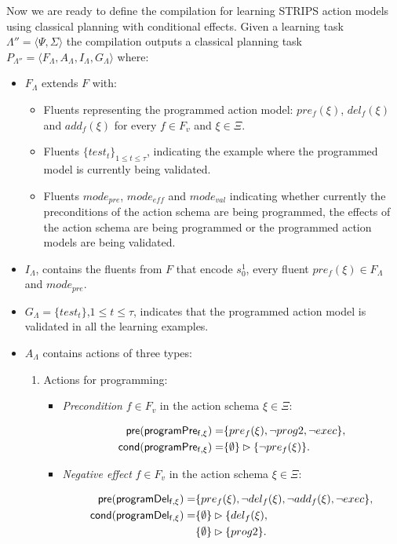 \documentclass[letterpaper]{article} %
\newcommand{\tup}[1]{{\langle #1 \rangle}}
\newcommand{\pre}{\mathsf{pre}}     %
\newcommand{\cond}{\mathsf{cond}}   %
\begin{document}
Now we are ready to define the compilation for learning STRIPS action models using classical planning with conditional effects. Given a learning task $\Lambda''=\tup{\Psi,\Sigma}$ the compilation outputs a classical planning task $P_{\Lambda''}=\tup{F_{\Lambda},A_{\Lambda},I_{\Lambda},G_{\Lambda}}$ where:
\begin{itemize}
\item $F_{\Lambda}$ extends $F$ with:
\begin{itemize}
\item Fluents representing the programmed action model: $pre_f(\xi)$, $del_f(\xi)$ and $add_f(\xi)$ for every $f\in F_v$ and $\xi \in \Xi$.
\item Fluents $\{test_t\}_{1\leq t\leq \tau}$, indicating the example where the programmed model is currently being validated.
\item Fluents $mode_{pre}$, $mode_{eff}$ and $mode_{val}$ indicating whether currently the preconditions of the action schema are being programmed, the effects of the action schema are being programmed or the programmed action models are being validated.
\end{itemize}
\item $I_{\Lambda}$, contains the fluents from $F$ that encode $s_0^1$, every fluent $pre_f(\xi)\in F_{\Lambda}$ and $mode_{pre}$. 
\item $G_{\Lambda}=\{test_t\}$,{\small $1\leq t\leq \tau$}, indicates that the programmed action model is validated in all the learning examples.
\item $A_{\Lambda}$ contains actions of three types:
\begin{enumerate}
\item Actions for programming:

\begin{itemize}
\item {\em Precondition} $f\in F_v$ in the action schema $\xi\in\Xi$:
\begin{small}
\begin{align*}
\hspace*{7pt}\pre(\mathsf{programPre_{f,\xi}})=&\{pre_{f}(\xi),\neg prog2,\neg exec\},\\    
\cond(\mathsf{programPre_{f,\xi}})=&\{\emptyset\}\rhd\{\neg pre_{f}(\xi)\}.
\end{align*}
\end{small}

\item {\em Negative effect} $f\in F_v$ in the action schema $\xi\in\Xi$:
\begin{small}
\begin{align*}
\hspace*{7pt}\pre(\mathsf{programDel_{f,\xi}})=&\{pre_{f}(\xi),\neg del_{f}(\xi),\neg add_{f}(\xi),\neg exec\},\\                                                   
\cond(\mathsf{programDel_{f,\xi}})=&\{\emptyset\}\rhd\{del_{f}(\xi),\\
&\{\emptyset\}\rhd\{prog2\}.
\end{align*}
\end{small}


\end{itemize}
\end{enumerate}
\end{itemize}
\end{document}
